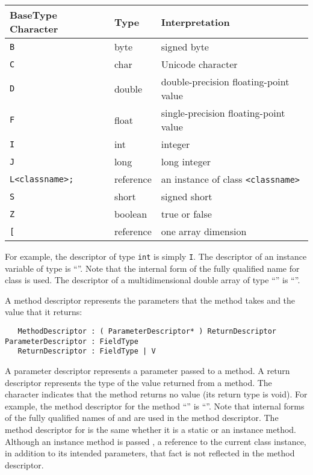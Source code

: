\begin{table}
\begin{tabular}{l|l|l}
BaseType Character	& Type	& Interpretation \\
\hline
{\tt B} &byte& signed byte \\
{\tt C} &char& Unicode character \\
{\tt D} &double& double-precision floating-point value \\
{\tt F} &float& single-precision floating-point value \\
{\tt I} &int& integer \\
{\tt J} &long& long integer \\
{\tt L<classname>;}	&reference& an instance of class {\tt <classname>} \\
{\tt S}	&short& signed short \\
{\tt Z}	&boolean& true or false \\
{\tt [}	&reference& one array dimension
\end{tabular}
\end{table}

For example, the descriptor of type {\tt int}
 is simply {\tt I}.  The descriptor of an instance variable of
 type  is ``''.  Note that the
 internal form of the fully qualified name for class  is
 used. The descriptor of a multidimensional double array of type
 ``'' is ``\code{[[[D}''.

A method descriptor represents the parameters that the method takes
and the value that it returns:

\begin{framed}
\begin{verbatim}
   MethodDescriptor : ( ParameterDescriptor* ) ReturnDescriptor
ParameterDescriptor : FieldType
   ReturnDescriptor : FieldType | V
\end{verbatim}
\end{framed}

A parameter descriptor represents a parameter passed to a method.  A
return descriptor represents the type of the value returned from a
method.  The character  indicates that the method returns no
value (its return type is void).  For example, the method descriptor
for the method
``'' is
``''.
Note that internal forms of the fully qualified names of  and
 are used in the method descriptor.  The method descriptor for
 is the same whether it is a static or an instance
method. Although an instance method is passed , a reference to the
current class instance, in addition to its intended parameters, that
fact is not reflected in the method descriptor.

